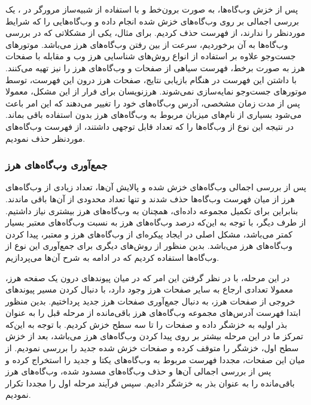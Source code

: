 \documentclass[twoside, a4paper,11pt]{book}
\numberwithin{equation}{chapter}
\numberwithin{table}{chapter}
\numberwithin{figure}{chapter}
\numberwithin{equation}{chapter}
\begin{document}
پس از خزش وب‌گاه‌ها، به صورت برون‌خط و با استفاده از شبیه‌ساز مرورگر در ، یک بررسی اجمالی بر روی وب‌گاه‌های خزش شده انجام داده و وب‌گاه‌هایی را که شرایط موردنظر را ندارند، از فهرست حذف کردیم.
برای مثال، یکی از مشکلاتی که در بررسی وب‌گاه‌ها به آن برخوردیم، سرعت از بین رفتن وب‌گاه‌های هرز می‌باشد. موتورهای جست‌و‌جو علاوه بر استفاده از انواع روش‌های شناسایی هرز وب و مقابله با صفحات هرز به صورت برخط، فهرست سیاهی از صفحات و وب‌گاه‌های هرز را نیز تهیه می‌کنند. با داشتن این فهرست در هنگام بازیابی نتایج، صفحات هرز درون این فهرست، توسط موتورهای جست‌و‌جو نمایه‌سازی‌‌‌ نمی‌شوند. هرزنویسان برای فرار از این مشکل، معمولا پس از مدت زمان مشخصی، آدرس وب‌گاه‌های خود را تغییر می‌دهند که این امر باعث می‌شود بسیاری از نام‌های میزبان مربوط به وب‌گاه‌های هرز بدون استفاده باقی بماند. در نتیجه این نوع از وب‌گاه‌ها را که تعداد قابل توجهی داشتند، از فهرست وب‌گاه‌های موردنظر حذف نمودیم. 


\subsubsection{جمع‌آوری وب‌گاه‌های هرز}
پس از بررسی اجمالی وب‌گاه‌های خزش شده و پالایش آن‌‌ها، تعداد زیادی از وب‌گاه‌های هرز از میان فهرست وب‌گاه‌ها حذف شدند و تنها تعداد محدودی از آن‌ها باقی ماندند. بنابراین برای تکمیل مجموعه داده‌ای، همچنان به وب‌گاه‌های هرز بیشتری نیاز داشتیم.
از طرف دیگر، با توجه به این‌که درصد وب‌گاه‌های هرز به نسبت وب‌گاه‌های معتبر بسیار کمتر می‌باشد، مشکل اصلی در ایجاد پیکره‌ای از وب‌گاه‌های هرز و معتبر، پیدا کردن وب‌گاه‌های هرز می‌باشد. بدین منظور از روش‌های دیگری برای جمع‌آوری این نوع از وب‌گاه‌ها استفاده کردیم که در ادامه به شرح آن‌ها می‌پردازیم. 

در این مرحله، با در نظر گرفتن این امر که در میان پیوندهای درون یک صفحه هرز، معمولا تعدادی ارجاع  به سایر صفحات هرز وجود دارد، با دنبال کردن مسیر پیوندهای خروجی از صفحات هرز، به دنبال جمع‌آوری صفحات هرز جدید پرداختیم. بدین منظور ابتدا فهرست آدرس‌های مجموعه وب‌گاه‌های هرز باقی‌مانده از مرحله قبل را به عنوان بذر اولیه به خزشگر  داده و صفحات را تا سه سطح خزش کردیم. با توجه به این‌که تمرکز ما در این مرحله بیشتر بر روی پیدا کردن وب‌گاه‌های هرز می‌باشد، بعد از خزش سطح اول، خزشگر را متوقف کرده و صفحات خزش شده جدید را بررسی نمودیم. از میان این صفحات، مجددا فهرست مربوط به وب‌گاه‌های یکتا و جدید را استخراج کرده و پس از بررسی اجمالی آن‌ها و حذف وب‌گاه‌های مسدود شده، وب‌گاه‌های هرز باقی‌مانده را به عنوان بذر به خزشگر دادیم. سپس فرآیند مرحله اول را مجددا تکرار نمودیم. 
\end{document}
